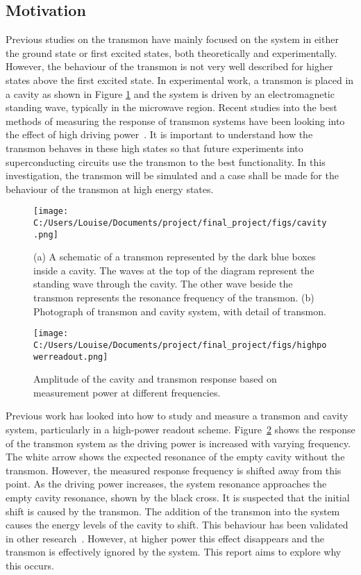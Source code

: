 \documentclass[11pt]{article}
\begin{document}
\subsection{Motivation}
Previous studies on the transmon have mainly focused on the system in either the ground state or first excited states, both theoretically and experimentally. However, the behaviour of the transmon is not very well described for higher states above the first excited state. In experimental work, a transmon is placed in a cavity as shown in Figure \ref{fig:picture2} and the system is driven by an electromagnetic standing wave, typically in the microwave region. Recent studies into the best methods of measuring the response of transmon systems have been looking into the effect of high driving power~\cite{reedHighFidelityReadoutCircuit2010}. It is important to understand how the transmon behaves in these high states so that future experiments into superconducting circuits use the transmon to the best functionality. In this investigation, the transmon will be simulated and a case shall be made for the behaviour of the transmon at high energy states.
\begin{figure}[ht]
\centering
\texttt{[image: C:/Users/Louise/Documents/project/final\_project/figs/cavity.png]}
\caption{(a) A schematic of a transmon represented by the dark blue boxes inside a cavity. The waves at the top of the diagram represent the standing wave through the cavity. The other wave beside the transmon represents the resonance frequency of the transmon. (b) Photograph of transmon and cavity system, with detail of transmon.}
\label{fig:picture2}
\end{figure}
\begin{figure}[ht]
\centering
\texttt{[image: C:/Users/Louise/Documents/project/final\_project/figs/highpowerreadout.png]}
\caption{Amplitude of the cavity and transmon response based on measurement power at different frequencies.}
\label{fig:picture3}
\end{figure}
Previous work has looked into how to study and measure a transmon and cavity system, particularly in a high-power readout scheme. Figure~\ref{fig:picture3} shows the response of the transmon system as the driving power is increased with varying frequency. The white arrow shows the expected resonance of the empty cavity without the transmon. However, the measured response frequency is shifted away from this point. As the driving power increases, the system resonance approaches the empty cavity resonance, shown by the black cross. It is suspected that the initial shift is caused by the transmon. The addition of the transmon into the system causes the energy levels of the cavity to shift. This behaviour has been validated in other research~\cite{bishopResponseStronglyDriven2010,paikObservationHighCoherence2011,elliottApplicationsFokkerPlanckEquation2016}. However, at higher power this effect disappears and the transmon is effectively ignored by the system. This report aims to explore why this occurs.
\end{document}
